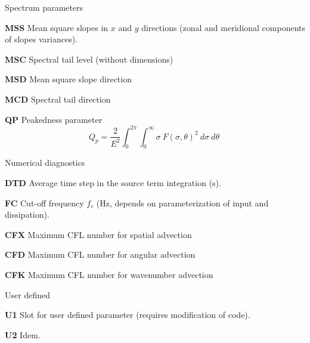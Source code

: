 \begin{list}{)\hfill}
\item{Spectrum parameters}

\begin{list}{)\hfill}
            { \leftmargin 8mm 
             \rightmargin 0mm \itemsep 0mm \parsep 0mm}

\item \textbf{MSS} Mean square slopes in $x$ and $y$ directions (zonal and meridional components of slopes variances). 
\item \textbf{MSC} Spectral tail level (without dimensions) 
\item \textbf{MSD} Mean square slope direction
\item \textbf{MCD} Spectral tail direction
\item \textbf{QP}  Peakedness parameter \citep{art:G70}
      \begin{equation} Q_p = \frac{2}{E^2} \int_0^{2\pi} \int_0^\infty
      \sigma\:F(\sigma,\theta)^2\:d\sigma\:d\theta \: \label{eq:qp}
      \end{equation}
\end{list}

\item{Numerical diagnostics }

\begin{list}{)\hfill}
            { \leftmargin 8mm 
             \rightmargin 0mm \itemsep 0mm \parsep 0mm}
\item \textbf{DTD} Average time step in the source term integration (s).
\item \textbf{FC} Cut-off frequency $f_c$ (Hz, depends on parameterization of
      input and dissipation).
\item \textbf{CFX} Maximum CFL number for spatial advection 
\item \textbf{CFD} Maximum CFL number for angular advection 
\item \textbf{CFK} Maximum CFL number for wavenumber advection 
\end{list}

\item{User defined }

\begin{list}{)\hfill}
            { \leftmargin 8mm 
             \rightmargin 0mm \itemsep 0mm \parsep 0mm}

\item \textbf{U1} Slot for user defined parameter (requires modification of code).
\item \textbf{U2} Idem.
\end{list}

\end{list}




